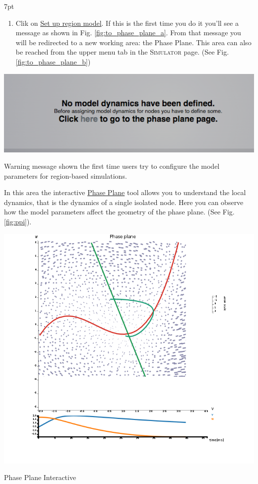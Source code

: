 \documentclass{tufte-handout}
\newenvironment{simulation}{%
  \def\FrameCommand{%
    \hspace{1pt}%
    {\color{ForestGreen}\vrule width 2pt}%
    {\color{simulationshade}\vrule width 4pt}%
    \colorbox{simulationshade}%
  }%
  \MakeFramed{\advance\hsize-\width\FrameRestore}%
  \noindent\hspace{-4.55pt}%
  \begin{adjustwidth}{}{7pt}%
  \vspace{2pt}\vspace{2pt}%
}
{%
  \vspace{2pt}\end{adjustwidth}\endMakeFramed%
}
\begin{document}
\begin{simulation}
\begin{enumerate}
\item  Clik on \underline{Set up region model}. If this is the first time you do it you'll see a message as shown in Fig. \ref{fig:to_phase_plane_a}.
From that message you will be redirected to a new working area: the Phase Plane. This area can also be reached from the upper menu tab in the \textsc{Simulator} page. (See Fig. \ref{fig:to_phase_plane_b}) 

\end{enumerate}
\end{simulation}

\begin{marginfigure}
  \includegraphics[width=\linewidth]{Handout_UI_BrainNetworkModelsAtRest_ToPhasePlane_a}%
  \caption{Warning message shown the first time users try to configure the model parameters for region-based simulations.}%
  \label{fig:to_phase_plane_a}%
\end{marginfigure}


In this area the interactive \underline{Phase Plane} tool allows you to
understand the local dynamics, that is the dynamics of a single isolated node.
Here you can observe how the model parameters affect the geometry of the phase
plane. (See Fig. \ref{fig:ppi}).

\begin{marginfigure}%
  \includegraphics[width=\linewidth]{Handout_UI_BrainNetworkModelsAtRest_PhasePlane}%
  \caption{Phase Plane Interactive}%
  \label{fig:ppi}%
\end{marginfigure}%
\end{document}
